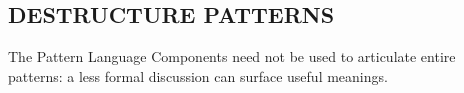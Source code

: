 \subsection*{\normalsize{} DESTRUCTURE PATTERNS{\hfill\cognitive}}
The {\sc Pattern Language Components} need not be used to articulate
entire patterns: a less formal discussion can surface useful meanings.
